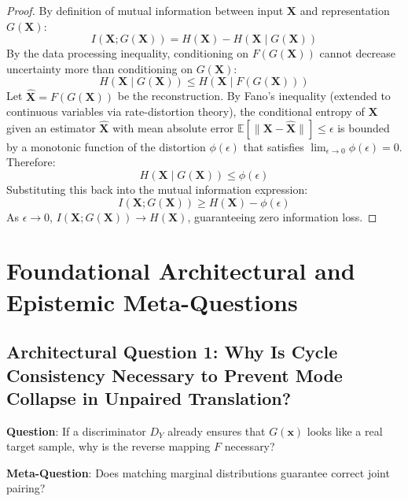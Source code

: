 \documentclass[11pt,a4paper]{article}
\theoremstyle{definition}
\begin{document}
\begin{proof}
By definition of mutual information between input $\mathbf{X}$ and representation $G(\mathbf{X})$:
{\boldmath
\begin{equation}
I(\mathbf{X}; G(\mathbf{X})) = H(\mathbf{X}) - H(\mathbf{X} \mid G(\mathbf{X}))
\end{equation}
}
By the data processing inequality, conditioning on $F(G(\mathbf{X}))$ cannot decrease uncertainty more than conditioning on $G(\mathbf{X})$:
{\boldmath
\begin{equation}
H(\mathbf{X} \mid G(\mathbf{X})) \le H(\mathbf{X} \mid F(G(\mathbf{X})))
\end{equation}
}
Let $\hat{\mathbf{X}} = F(G(\mathbf{X}))$ be the reconstruction. By Fano's inequality (extended to continuous variables via rate-distortion theory), the conditional entropy of $\mathbf{X}$ given an estimator $\hat{\mathbf{X}}$ with mean absolute error $\mathbb{E}[\|\mathbf{X} - \hat{\mathbf{X}}\|] \le \epsilon$ is bounded by a monotonic function of the distortion $\phi(\epsilon)$ that satisfies $\lim_{\epsilon \to 0} \phi(\epsilon) = 0$.
Therefore:
{\boldmath
\begin{equation}
H(\mathbf{X} \mid G(\mathbf{X})) \le \phi(\epsilon)
\end{equation}
}
Substituting this back into the mutual information expression:
{\boldmath
\begin{equation}
I(\mathbf{X}; G(\mathbf{X})) \ge H(\mathbf{X}) - \phi(\epsilon)
\end{equation}
}
As $\epsilon \to 0$, $I(\mathbf{X}; G(\mathbf{X})) \to H(\mathbf{X})$, guaranteeing zero information loss.
\end{proof}

\section{Foundational Architectural and Epistemic Meta-Questions}

\subsection{Architectural Question 1: Why Is Cycle Consistency Necessary to Prevent Mode Collapse in Unpaired Translation?}
\textbf{Question}: If a discriminator $D_Y$ already ensures that $G(\mathbf{x})$ looks like a real target sample, why is the reverse mapping $F$ necessary?

\textbf{Meta-Question}: Does matching marginal distributions guarantee correct joint pairing?
\end{document}
